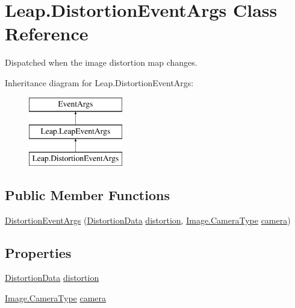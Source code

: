 \hypertarget{class_leap_1_1_distortion_event_args}{}\section{Leap.\+Distortion\+Event\+Args Class Reference}
\label{class_leap_1_1_distortion_event_args}


Dispatched when the image distortion map changes.  


Inheritance diagram for Leap.\+Distortion\+Event\+Args\+:\begin{figure}[H]
\begin{center}
\leavevmode
\includegraphics[height=3.000000cm]{class_leap_1_1_distortion_event_args}
\end{center}
\end{figure}
\subsection*{Public Member Functions}
\begin{DoxyCompactItemize}
\item 
\mbox{\hyperlink{class_leap_1_1_distortion_event_args_aa244fd4062a5fc74a992d9d07a6160ac}{Distortion\+Event\+Args}} (\mbox{\hyperlink{class_leap_1_1_distortion_data}{Distortion\+Data}} \mbox{\hyperlink{class_leap_1_1_distortion_event_args_aa06063f50cce254897edbc9b952ca4eb}{distortion}}, \mbox{\hyperlink{class_leap_1_1_image_a28310e43e0f2d7f7117e1b45330bdc38}{Image.\+Camera\+Type}} \mbox{\hyperlink{class_leap_1_1_distortion_event_args_a99cc48f7f4f195933d9c12241308d0da}{camera}})
\end{DoxyCompactItemize}
\subsection*{Properties}
\begin{DoxyCompactItemize}
\item 
\mbox{\hyperlink{class_leap_1_1_distortion_data}{Distortion\+Data}} \mbox{\hyperlink{class_leap_1_1_distortion_event_args_aa06063f50cce254897edbc9b952ca4eb}{distortion}}
\item 
\mbox{\hyperlink{class_leap_1_1_image_a28310e43e0f2d7f7117e1b45330bdc38}{Image.\+Camera\+Type}} \mbox{\hyperlink{class_leap_1_1_distortion_event_args_a99cc48f7f4f195933d9c12241308d0da}{camera}}
\end{DoxyCompactItemize}


